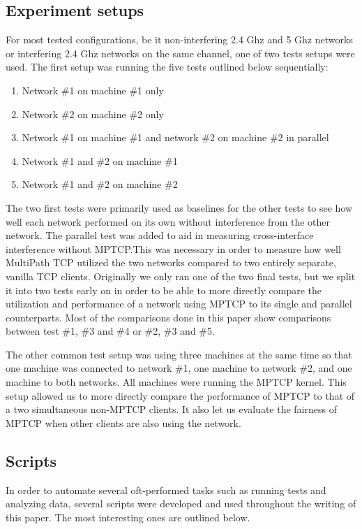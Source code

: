 \documentclass[12pt,a4paper]{article}
\begin{document}
\subsection{Experiment setups}
For most tested configurations, be it non-interfering 2.4 Ghz and 5 Ghz networks
or interfering 2.4 Ghz networks on the same channel, one of two tests setups
were used. The first setup was running the five tests outlined below
sequentially:

\begin{enumerate}
  \item Network \#1 on machine \#1 only
  \item Network \#2 on machine \#2 only
  \item Network \#1 on machine \#1 and network \#2 on machine \#2 in parallel
  \item Network \#1 and \#2 on machine \#1
  \item Network \#1 and \#2 on machine \#2
\end{enumerate}

The two first tests were primarily used as baselines for the other tests to see
how well each network performed on its own without interference from the other
network. The parallel test was added to aid in measuring cross-interface
interference without MPTCP.\@ This was necessary in order to measure how well
MultiPath TCP utilized the two networks compared to two entirely separate,
vanilla TCP clients. Originally we only ran one of the two final tests, but we
split it into two tests early on in order to be able to more directly compare
the utilization and performance of a network using MPTCP to its single and
parallel counterparts. Most of the comparisons done in this paper show
comparisons between test \#1, \#3 and \#4 or \#2, \#3 and \#5.

The other common test setup was using three machines at the same time so that
one machine was connected to network \#1, one machine to network \#2, and one
machine to both networks. All machines were running the MPTCP kernel. This setup
allowed us to more directly compare the performance of MPTCP to that of a two
simultaneous non-MPTCP clients. It also let us evaluate the fairness of MPTCP
when other clients are also using the network.

\subsection{Scripts}
In order to automate several oft-performed tasks such as running tests and
analyzing data, several scripts were developed and used throughout the writing
of this paper. The most interesting ones are outlined below.
\end{document}
